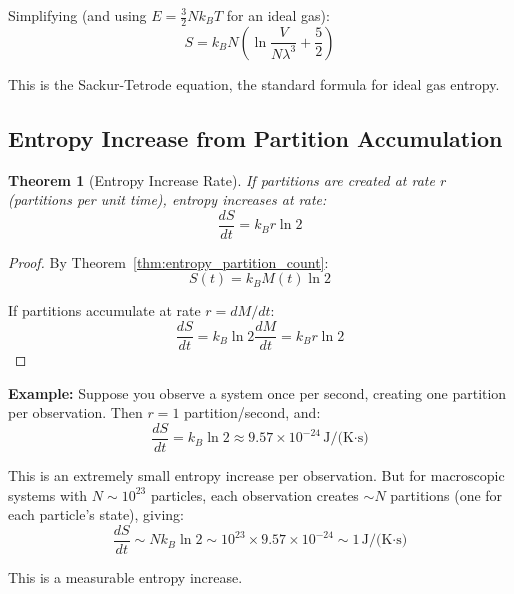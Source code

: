 \documentclass[twocolumn,10pt]{article}
\newtheorem{theorem}{Theorem}[section]
\theoremstyle{definition}
\theoremstyle{remark}
\begin{document}
Simplifying (and using $E = \frac{3}{2} N k_B T$ for an ideal gas):
\begin{equation}
S = k_B N \left( \ln \frac{V}{N\lambda^3} + \frac{5}{2} \right)
\end{equation}

This is the Sackur-Tetrode equation\cite{sackur1913,tetrode1912}, the standard formula for ideal gas entropy.

\subsection{Entropy Increase from Partition Accumulation}

\begin{theorem}[Entropy Increase Rate]
\label{thm:entropy_increase_rate}
If partitions are created at rate $r$ (partitions per unit time), entropy increases at rate:
\begin{equation}
\frac{dS}{dt} = k_B r \ln 2
\end{equation}
\end{theorem}

\begin{proof}
By Theorem~\ref{thm:entropy_partition_count}:
\begin{equation}
S(t) = k_B M(t) \ln 2
\end{equation}

If partitions accumulate at rate $r = dM/dt$:
\begin{equation}
\frac{dS}{dt} = k_B \ln 2 \frac{dM}{dt} = k_B r \ln 2
\end{equation}
\end{proof}

\noindent\textbf{Example:} Suppose you observe a system once per second, creating one partition per observation. Then $r = 1$ partition/second, and:
\begin{equation}
\frac{dS}{dt} = k_B \ln 2 \approx 9.57 \times 10^{-24} \, \text{J/(K·s)}
\end{equation}

This is an extremely small entropy increase per observation. But for macroscopic systems with $N \sim 10^{23}$ particles, each observation creates $\sim N$ partitions (one for each particle's state), giving:
\begin{equation}
\frac{dS}{dt} \sim N k_B \ln 2 \sim 10^{23} \times 9.57 \times 10^{-24} \sim 1 \, \text{J/(K·s)}
\end{equation}

This is a measurable entropy increase.
\end{document}
